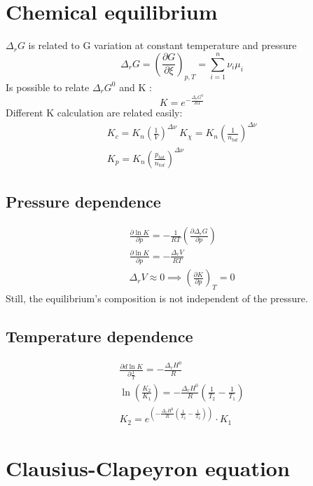 \documentclass[a4paper]{report}
\begin{document}
\begin{multicols}{2}
    \section{Chemical equilibrium}
    \( \Delta _{r}G  \) is related to G variation at constant temperature and pressure
    \[
      \Delta_{r} G =  \left(  \frac{\partial G}{\partial \xi} \right)_{p,T} = \sum_{i=1}^{n} \nu _{i} \mu _{i}  
    \] 
    Is possible to relate \( \Delta _{r}G^{0}   \) and K :
     \[
      K = e ^{-\frac{\Delta _{r}G^{0}  }{RT}} 
     \]  
    Different K calculation are related easily:
    \begin{gather*}
      K_{c} = K_{n} \left (\frac{1}{V} \right)^{\Delta \nu}  ~ K_{\chi } = K_{n} \left(\frac{1}{n_{tot} }\right)^{\Delta \nu } \\
      K_{p} = K_{n} \left(\frac{p_{tot}}{n_{tot}}\right) ^{\Delta \nu} \quad 
    \end{gather*}
    \subsection{Pressure dependence}
    \begin{gather*}
      \frac{\partial \ln K}{\partial p} = - \frac{1}{RT} \left( \frac{\partial \Delta_{r}  G}{\partial p}  \right)  \\
      \frac{\partial \ln K}{\partial p} = - \frac{\Delta _{r}V }{RT} \\
      \Delta _{r} V \approx 0 \implies \left( \frac{\partial K}{\partial p}  \right)_{T} = 0  
    \end{gather*} 
    Still, the equilibrium's composition is not independent of the pressure.
    \subsection{Temperature dependence}
    \begin{gather*}
      \frac{\partial d\ln K}{\partial \frac{1}{T}} = - \frac{\Delta_{r}H^{0}}{R}\\
      \ln \left( \frac{K_2}{K_1} \right) = -  \frac{\Delta_{r}H^{0}}{R}\left(\frac{1}{T_2} - \frac{1}{T_1} \right)\\
      K_2 = e^{\left( - \frac{\Delta_{r}H^{0}  }{R}(\frac{1}{T_2} - \frac{1}{T_2})  \right) } \cdot K_1
    \end{gather*}
    
    \section{Clausius-Clapeyron equation}


\end{multicols}
\end{document}
